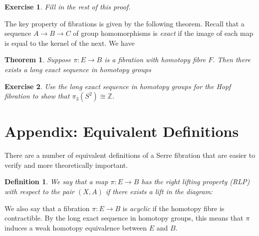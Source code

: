 \documentclass[11pt]{article}
\newtheorem{theorem}{Theorem}
\newtheorem{exercise}{Exercise}
\newtheorem{definition}{Definition}
\begin{document}
\begin{exercise}
Fill in the rest of this proof.
\end{exercise}

The key property of fibrations is given by the following theorem. Recall that a sequence $A \to B \to C$ of group homomorphisms is \textit{exact} if the image of each map is equal to the kernel of the next. We have
\begin{theorem}
Suppose $\pi: E \to B$ is a fibration with homotopy fibre $F$. Then there exists a long exact sequence in homotopy groups
\begin{center}
\end{center}
\end{theorem}

\begin{exercise}
Use the long exact sequence in homotopy groups for the Hopf fibration to show that $\pi_3(S^2) \cong \mathbb{Z}$. 
\end{exercise}

\section*{Appendix: Equivalent Definitions}

There are a number of equivalent definitions of a Serre fibration that are easier to verify and more theoretically important.

\begin{definition}
We say that a map $\pi: E \to B$ has the right lifting property (RLP) with respect to the pair $(X,A)$ if there exists a lift in the diagram:
\begin{center}
\end{center}
\end{definition}

We also say that a fibration $\pi: E \to B$ is \textit{acyclic} if the homotopy fibre is contractible. By the long exact sequence in homotopy groups, this means that $\pi$ induces a weak homotopy equivalence between $E$ and $B$.
\end{document}
